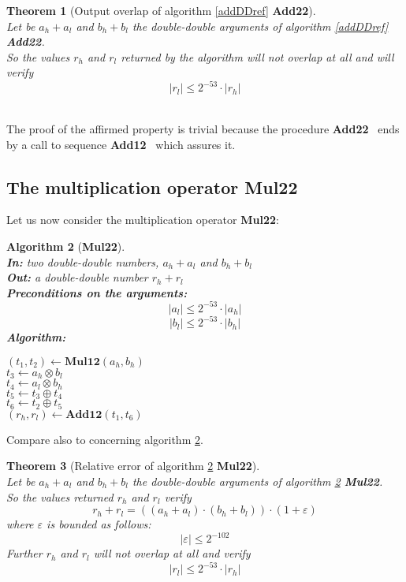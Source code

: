 \documentclass[a4paper,10pt,twoside]{article}
\newtheorem{theorem}{Theorem}[section]
\newtheorem{algorithm}[theorem]{Algorithm}
\newenvironment{proof}[1][Proof]{\begin{trivlist}
\item[\hskip \labelsep {\bfseries #1}]}{\end{trivlist}}
\newcommand{\qed}{\nobreak \ifvmode \relax \else \ifdim \lastskip<1.5em \hskip-\lastskip
\hskip1.5em plus0em minus0.5em \fi \nobreak \vrule height0.75em width0.5em depth0.25em\fi}
\newcommand{\hi}{\ensuremath{\mathit{h}}}
\newcommand{\lo}{\ensuremath{\mathit{l}}}
\newcommand{\Add}{{\bf Add12}}
\newcommand{\AddDD}{{\bf Add22}}
\newcommand{\MulDD}{{\bf Mul22}}
\newcommand{\mAdd}{\ensuremath{\mathbf{Add12}}}
\newcommand{\mMul}{\ensuremath{\mathbf{Mul12}}}
\renewcommand{\epsilon}{\varepsilon}
\begin{document}
\begin{theorem}[Output overlap of algorithm \ref{addDDref} \AddDD] ~ \\
Let be $a_\hi + a_\lo$ and $b_\hi + b_\lo$ the double-double arguments of algorithm \ref{addDDref} \AddDD.\\
So the values $r_\hi$ and $r_\lo$ returned by the algorithm will not overlap
at all and will verify
$$\left \vert r_\lo \right \vert \leq 2^{-53} \cdot \left \vert r_\hi \right \vert$$
\end{theorem}
\begin{proof} ~\\
The proof of the affirmed property is trivial because the procedure \AddDD~
ends by a call to sequence \Add~ which assures it.\qed
\end{proof}
\subsection{The multiplication operator \MulDD}
Let us now consider the multiplication operator \MulDD:
\begin{algorithm}[\MulDD] \label{mulDDref} ~ \\
{\bf In:} two double-double numbers, $a_\hi + a_\lo$ and $b_\hi + b_\lo$ \\
{\bf Out:} a double-double number $r_\hi + r_\lo$ \\
{\bf Preconditions on the arguments:} $$\left \vert a_\lo \right \vert \leq 2^{-53} \cdot \left \vert a_\hi \right \vert$$
                            $$\left \vert b_\lo \right \vert \leq 2^{-53} \cdot \left \vert b_\hi \right \vert$$
{\bf Algorithm:} \\
\begin{center}
\begin{minipage}[b]{50mm}
$\left( t_1, t_2 \right) \gets \mMul\left( a_\hi, b_\hi \right)$ \\
$t_3 \gets a_\hi \otimes b_\lo$ \\
$t_4 \gets a_\lo \otimes b_\hi$ \\
$t_5 \gets t_3 \oplus t_4$ \\
$t_6 \gets t_2 \oplus t_5$ \\
$\left(r_\hi, r_\lo \right) \gets \mAdd\left( t_1, t_6 \right)$\\
\end{minipage}
\end{center}
\end{algorithm}
Compare also to \cite{crlibmweb} concerning algorithm \ref{mulDDref}.
\begin{theorem}[Relative error of algorithm \ref{mulDDref} \MulDD] ~ \\
Let be $a_\hi + a_\lo$ and $b_\hi + b_\lo$ the double-double arguments of algorithm \ref{mulDDref} \MulDD.\\
So the values returned $r_\hi$ and $r_\lo$ verify
$$r_\hi + r_\lo = \left(\left(a_\hi + a_\lo \right) \cdot \left( b_\hi + b_\lo \right)\right) \cdot \left(1 + \epsilon\right)$$
where $\epsilon$ is bounded as follows:
$$\left \vert \epsilon \right \vert \leq 2^{-102}$$
Further $r_\hi$ and $r_\lo$ will not overlap at all and verify
$$\left \vert r_\lo \right \vert \leq 2^{-53} \cdot \left \vert r_\hi \right \vert$$
\end{theorem}
\end{document}
